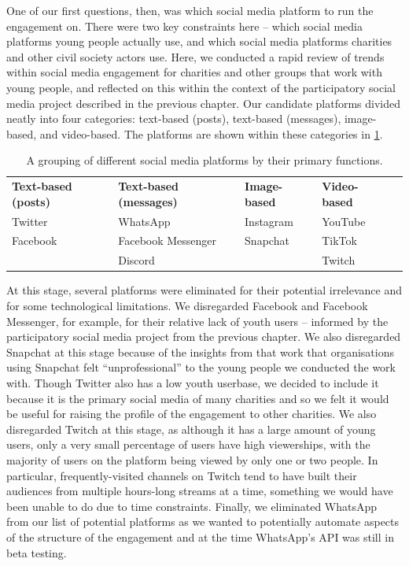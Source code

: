 One of our first questions, then, was which social media platform to run the engagement on. There were two key constraints here – which social media platforms young people actually use, and which social media platforms charities and other civil society actors use. Here, we conducted a rapid review of trends within social media engagement for charities and other groups that work with young people, and reflected on this within the context of the participatory social media project described in the previous chapter.  Our candidate platforms divided neatly into four categories: text-based (posts), text-based (messages), image-based, and video-based.  The platforms are shown within these categories in \ref{table:iof-social-media}.

\begin{table}[]
\begin{tabular}{lllll}
\caption{A grouping of different social media platforms by their primary functions. }
\label{table:iof-social-media}
\textbf{Text-based (posts)} & \textbf{Text-based (messages)} & \textbf{Image-based} & \textbf{Video-based} &  \\
Twitter                     & WhatsApp                       & Instagram            & YouTube              &  \\
Facebook                    & Facebook Messenger             & Snapchat             & TikTok               &  \\
                            & Discord                        &                      & Twitch               &
\end{tabular}
\end{table}

At this stage, several platforms were eliminated for their potential irrelevance and for some technological limitations. We disregarded Facebook and Facebook Messenger, for example, for their relative lack of youth users – informed by the participatory social media project from the previous chapter. We also disregarded Snapchat at this stage because of the insights from that work that organisations using Snapchat felt “unprofessional” to the young people we conducted the work with. Though Twitter also has a low youth userbase, we decided to include it because it is the primary social media of many charities and so we felt it would be useful for raising the profile of the engagement to other charities. We also disregarded Twitch at this stage, as although it has a large amount of young users, only a very small percentage of users have high viewerships, with the majority of users on the platform being viewed by only one or two people. In particular, frequently-visited channels on Twitch tend to have built their audiences from multiple hours-long streams at a time, something we would have been unable to do due to time constraints. Finally, we eliminated WhatsApp from our list of potential platforms as we wanted to potentially automate aspects of the structure of the engagement and at the time WhatsApp’s API was still in beta testing. 

